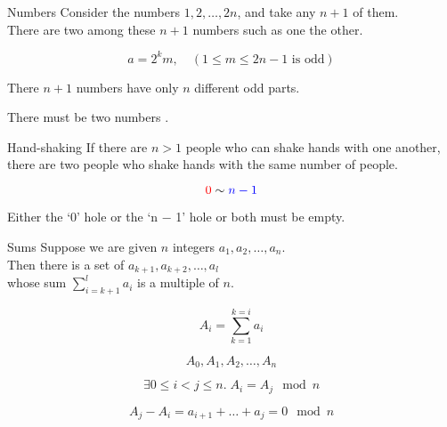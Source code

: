 \begin{frame}{}
  \begin{exampleblock}{Numbers}
    Consider the numbers $1, 2, \dots, 2n$, and take any $n+1$ of them. \\
    There are two among these $n+1$ numbers such as one  the other.
  \end{exampleblock}

  \pause
  \vspace{0.30cm}
  \begin{center}
    \[
      a = 2^{k} m, \quad (1 \le m \le 2n-1 \text{ is odd})
    \]

    There $n+1$ numbers have only $n$ different odd parts.

    \vspace{0.30cm}
    There must be two numbers .
  \end{center}
\end{frame}

\begin{frame}{}
  \begin{exampleblock}{Hand-shaking}
    If there are $n > 1$ people who can shake hands with one another, \\
    there are two people who shake hands with the same number of people.
  \end{exampleblock}

  \pause
  \[
    \textcolor{red}{0} \sim \textcolor{blue}{n-1}
  \]

  \pause
  \vspace{0.30cm}
  \begin{center}
    Either the `0' hole or the `n − 1' hole or both must be empty.
  \end{center}
\end{frame}

\begin{frame}{}
  \begin{exampleblock}{Sums}
    Suppose we are given $n$ integers $a_{1}, a_{2}, \dots, a_{n}$. \\
    Then there is a set of 
    $a_{k+1}, a_{k+2}, \dots, a_{l}$ \\
    whose sum $\sum_{i=k+1}^{l} a_{i}$ is a multiple of $n$.
  \end{exampleblock}

  \pause
  \[
    A_{i} = \sum_{k=1}^{k=i} a_{i}
  \]

  \pause
  \[
    A_{0}, A_{1}, A_{2}, \dots, A_{n}
  \]

  \pause
  \[
    \exists 0 \le i < j \le n.\; A_{i} = A_{j} \mod{n}
  \]

  \pause
  \[
    A_{j} - A_{i} = a_{i+1} + \dots + a_{j} = 0 \mod{n}
  \]
\end{frame}

